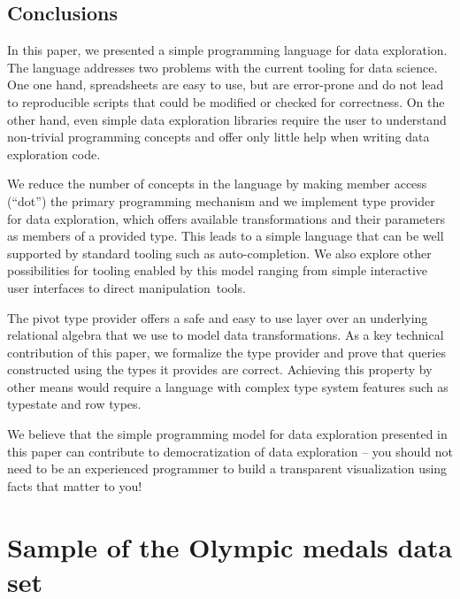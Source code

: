 \documentclass[a4paper,UKenglish]{lipics-v2016}
\theoremstyle{plain}
\theoremstyle{definition}
\begin{document}
\subsection{Conclusions}
In this paper, we presented a simple programming language for data exploration. The language 
addresses two problems with the current tooling for data science. One one hand, spreadsheets are 
easy to use, but are error-prone and do not lead to reproducible scripts that could be modified
or checked for correctness. On the other hand, even simple data exploration libraries require 
the user to understand non-trivial programming concepts and offer only little help when writing 
data exploration code.

We reduce the number of concepts in the language by making member access (``dot'') the primary
programming mechanism and we implement type provider for data exploration, which offers 
available transformations and their parameters as members of a provided type. This leads to a 
simple language that can be well supported by standard tooling such as auto-completion. 
We also explore other possibilities for tooling enabled by this model ranging from 
simple interactive user interfaces to direct manipulation~tools.

The pivot type provider offers a safe and easy to use layer over an underlying relational algebra 
that we use to model data transformations. As a key technical contribution of this paper, we 
formalize the type provider and prove that queries constructed using the types it provides are 
correct. Achieving this property by other means would require a language with complex
type system features such as typestate and row types.

We believe that the simple programming model for data exploration presented in this paper can
contribute to democratization of data exploration -- you should not need to be an experienced 
programmer to build a transparent visualization using facts that matter to you!



\appendix
\section{Sample of the Olympic medals data set}
\label{app:olympics-csv}
\end{document}
